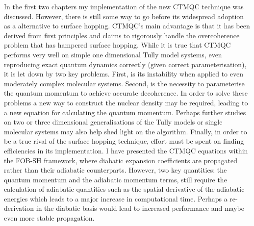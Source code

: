 In the first two chapters my implementation of the new CTMQC technique was discussed. However, there is still some way to go before its widespread adoption as a alternative to surface hopping. CTMQC's main advantage is that it has been derived from first principles and claims to rigorously handle the overcoherence problem that has hampered surface hopping. While it is true that CTMQC performs very well on simple one dimensional Tully model systems, even reproducing exact quantum dynamics correctly (given correct parameterisation), it is let down by two key problems. First, is its instability when applied to even moderately complex molecular systems. Second, is the necessity to parameterise the quantum momentum to achieve accurate decoherence. In order to solve these problems a new way to construct the nuclear density may be required, leading to a new equation for calculating the quantum momentum. Perhaps further studies on two or three dimensional generalisations of the Tully models or single molecular systems may also help shed light on the algorithm. Finally, in order to be a true rival of the surface hopping technique, effort must be spent on finding efficiencies in its implementation. I have presented the CTMQC equations within the FOB-SH framework, where diabatic expansion coefficients are propagated rather than their adiabatic counterparts. However, two key quantities: the quantum momentum and the adiabatic momentum terms, still require the calculation of adiabatic quantities such as the spatial derivative of the adiabatic energies which leads to a major increase in computational time. Perhaps a re-derivation in the diabatic basis would lead to increased performance and maybe even more stable propagation.
\\\\
